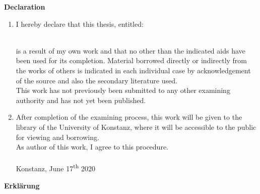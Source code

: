 
\begin{center}
   \Large \bf{Declaration}
\end{center}

\begin{enumerate}
    \item I hereby declare that this thesis, entitled:\\
        [0.5cm]
        \begin{minipage}{.9\textwidth}
            \begin{center}
                \large\bf\rawtitle
            \end{center}
        \end{minipage}\\
        [0.5cm]
        is a result of my own work and that no other than the indicated aids have been used for its completion. Material borrowed directly or indirectly from the works of others is indicated in each individual case by acknowledgement of the source and also the secondary literature used. \\
        This work has not previously been submitted to any other examining authority and has not yet been published.
    \item After completion of the examining process, this work will be given to the library of the University of Konstanz, where it will be accessible to the public for viewing and borrowing. \\As author of this work, I agree to this procedure.\\
    \vspace{0.2cm}\\
    Konstanz, June 17\textsuperscript{th} 2020\\
    \begin{minipage}{.9\textwidth}
        \raggedleft \underline{\hspace{7.0cm}}
     \end{minipage}
\end{enumerate}

\vfill

\begin{center}
    \Large \bf{Erklärung}
 \end{center}
 
